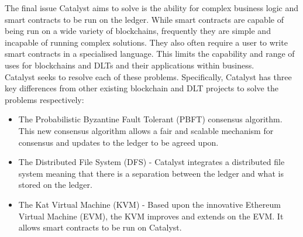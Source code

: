 The final issue Catalyst aims to solve is the ability for complex business logic and smart contracts to be run on the ledger. While smart contracts are capable of being run on a wide variety of blockchains, frequently they are simple and incapable of running complex solutions. They also often require a user to write smart contracts in a specialised language. This limits the capability and range of uses for blockchains and DLTs and their applications within business. \\

Catalyst seeks to resolve each of these problems. Specifically, Catalyst has three key differences from other existing blockchain and DLT projects to solve the problems respectively:

\begin{itemize}
\item The Probabilistic Byzantine Fault Tolerant (PBFT) consensus algorithm. This new consensus algorithm allows a fair and scalable mechanism for consensus and updates to the ledger to be agreed upon.
\item The Distributed File System (DFS) - Catalyst integrates a distributed file system meaning that there is a separation between the ledger and what is stored on the ledger.
\item The Kat Virtual Machine (KVM) - Based upon the innovative Ethereum Virtual Machine (EVM), the KVM improves and extends on the EVM. It allows smart contracts to be run on Catalyst. \\
\end{itemize}

\begin{comment}
NB - To be moved to the DFS section?

Catalyst solves this problem through the integration of a Distributed File System (DFS). This enables much more control for peers on the network in terms of what elements of the ledger they hold. This means that lightweight nodes can run with only a subset of the network data. Furthermore, large data files can be securely held on the ledger without causing issues for other nodes due to bloating.


\end{comment}